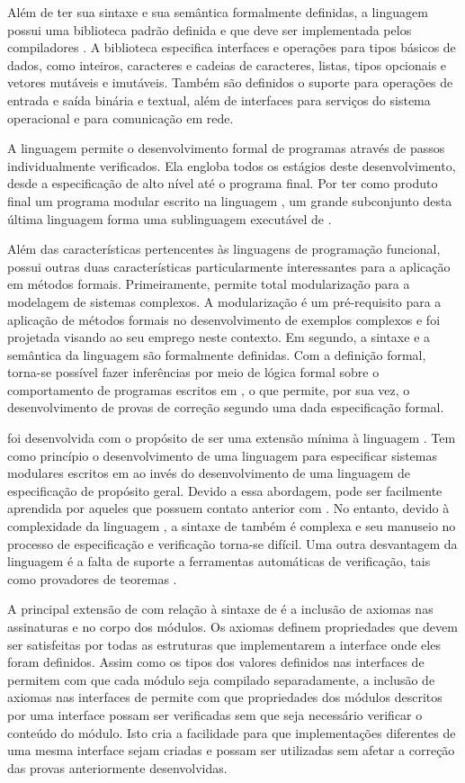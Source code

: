 Além de ter sua sintaxe e sua semântica formalmente definidas, a linguagem \SML possui uma biblioteca padrão definida e que deve ser implementada pelos compiladores \cite{MLLib}.
A biblioteca especifica interfaces e operações para tipos básicos de dados, como inteiros, caracteres e cadeias de caracteres, listas, tipos opcionais e vetores mutáveis e imutáveis.
Também são definidos o suporte para operações de entrada e saída binária e textual, além de interfaces para serviços do sistema operacional e para comunicação em rede.

A linguagem \EML permite o desenvolvimento formal de programas através de passos individualmente verificados.
Ela engloba todos os estágios deste desenvolvimento, desde a especificação de alto nível até o programa final.
Por ter como produto final um programa modular escrito na linguagem \SML, um grande subconjunto desta última linguagem forma uma sublinguagem executável de \EML.

Além das características pertencentes às linguagens de programação funcional, \EML possui outras duas características particularmente interessantes para a aplicação em métodos formais.
Primeiramente, permite total modularização para a modelagem de sistemas complexos.
A modularização é um pré-requisito para a aplicação de métodos formais no desenvolvimento de exemplos complexos e \EML foi projetada visando ao seu emprego neste contexto.
Em segundo, a sintaxe e a semântica da linguagem são formalmente definidas.
Com a definição formal, torna-se possível fazer inferências por meio de lógica formal sobre o comportamento de programas escritos em \SML, o que permite, por sua vez, o desenvolvimento de provas de correção segundo uma dada especificação formal.

\EML foi desenvolvida com o propósito de ser uma extensão mínima à linguagem \SML.
Tem como princípio o desenvolvimento de uma linguagem para especificar sistemas modulares escritos em \SML ao invés do desenvolvimento de uma linguagem de especificação de propósito geral.
Devido a essa abordagem, \EML pode ser facilmente aprendida por aqueles que possuem contato anterior com \SML.
No entanto, devido à complexidade da linguagem \SML, a sintaxe de \EML também é complexa e seu manuseio no processo de especificação e verificação torna-se difícil.
Uma outra desvantagem da linguagem é a falta de suporte a ferramentas automáticas de verificação, tais como provadores de teoremas \cite{MLSurvay}.

A principal extensão de \EML com relação à sintaxe de \SML é a inclusão de axiomas nas assinaturas e no corpo dos módulos.
Os axiomas definem propriedades que devem ser satisfeitas por todas as estruturas que implementarem a interface onde eles foram definidos.
Assim como os tipos dos valores definidos nas interfaces de \SML permitem com que cada módulo seja compilado separadamente, a inclusão de axiomas nas interfaces de \EML permite com que propriedades dos módulos descritos por uma interface possam ser verificadas sem que seja necessário verificar o conteúdo do módulo.
Isto cria a facilidade para que implementações diferentes de uma mesma interface sejam criadas e possam ser utilizadas sem afetar a correção das provas anteriormente desenvolvidas.

